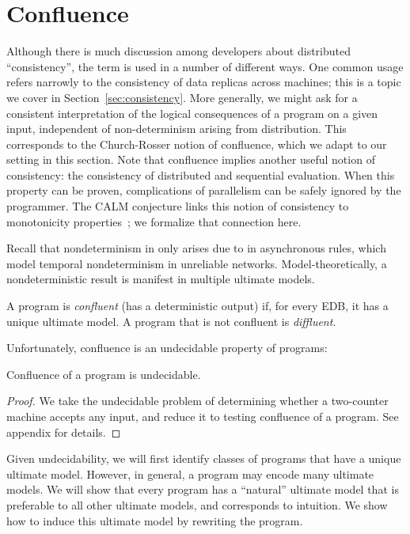 \section{Confluence}
\label{sec:confluence}
Although there is much discussion among developers about distributed ``consistency'', the term is used in a number of different ways.  One common usage refers narrowly to the consistency of data replicas across machines; this is a topic we cover in Section~\ref{sec:consistency}.  More generally, we might ask for a consistent interpretation of the logical consequences of a program on a given input, independent of non-determinism arising from distribution. 
This corresponds to the Church-Rosser notion of confluence, which we adapt to our setting in this section.  Note that confluence implies another useful notion of consistency: the consistency  of distributed and sequential evaluation.  When this property can be proven, complications of parallelism can be safely ignored by the programmer.  The CALM conjecture links this notion of consistency to monotonicity properties~\cite{podskey-sigrec}; we formalize that connection here. 

Recall that nondeterminism in \lang only arises due to  in asynchronous rules, 
which model temporal nondeterminism in unreliable networks.
Model-theoretically, a nondeterministic result is manifest in multiple ultimate models.

\begin{definition}
A \lang program is {\em confluent} (has a deterministic output) if, for every EDB, it has a unique ultimate model.  A program that is not confluent is {\em diffluent}.
\end{definition}

Unfortunately, confluence is an undecidable property of \lang programs:

\begin{lemma}
\label{lem:confluence-undecidable}
Confluence of a \lang program is undecidable.
\end{lemma}
\begin{proof}
We take the undecidable problem of determining whether a two-counter machine accepts any input, and reduce it to testing confluence of a \lang program.  See appendix for details.
\end{proof}

Given undecidability, we will first identify classes of programs that have a unique ultimate model.  However, in general, a \lang program may encode many ultimate models.  We will show that every \lang program has a ``natural'' ultimate model that is preferable to all other ultimate models, and corresponds to intuition.  We show how to induce this ultimate model by rewriting the program.

